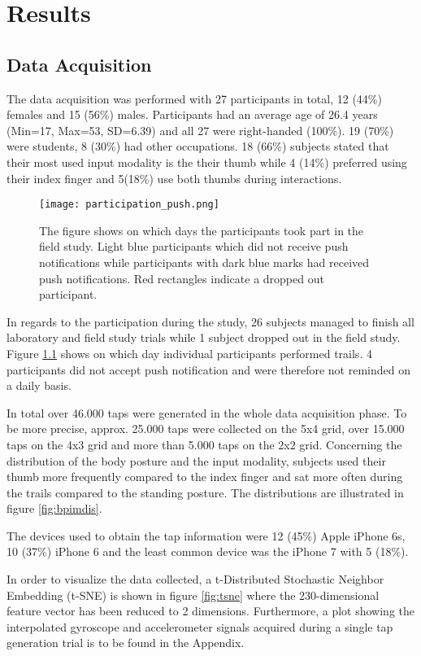 \chapter{Results\label{cha:chapter6}}
\section{Data Acquisition}
The data acquisition was performed with 27 participants in total, 12 (44\%) females and 15 (56\%) males. Participants had an average age of 26.4 years (Min=17, Max=53, SD=6.39) and all 27 were right-handed (100\%). 19 (70\%) were students, 8 (30\%) had other occupations.
18 (66\%) subjects stated that their most used input modality is the their thumb while 4 (14\%) preferred using their index finger and 5(18\%) use both thumbs during interactions.\\

\begin{figure}[h!]
  \centering
  \texttt{[image: participation\_push.png]}
  \caption{The figure shows on which days the participants took part in the field study. Light blue participants which did not receive push notifications while participants with dark blue marks had received push notifications. Red rectangles indicate a dropped out participant.} \label{fig:participation}
\end{figure}

In regards to the participation during the study, 26 subjects managed to finish all laboratory and field study trials while 1 subject dropped out in the field study. Figure \ref{fig:participation} shows on which day individual participants performed trails. 4 participants did not accept push notification and were therefore not reminded on a daily basis.

In total over 46.000 taps were generated in the whole data acquisition phase. To be more precise, approx. 25.000 taps were collected on the 5x4 grid, over 15.000 taps on the 4x3 grid and more than 5.000 taps on the 2x2 grid. Concerning the distribution of the body posture and the input modality, subjects used their thumb more frequently compared to the index finger and sat more often during the trails compared to the standing posture. The distributions are illustrated in figure \ref{fig:bpimdis}.

The devices used to obtain the tap information were 12 (45\%) Apple iPhone 6s, 10 (37\%) iPhone 6 and the least common device was the iPhone 7 with 5 (18\%).

In order to visualize the data collected, a t-Distributed Stochastic Neighbor Embedding (t-SNE) is shown in figure \ref{fig:tsne} where the 230-dimensional feature vector has been reduced to 2 dimensions. Furthermore, a plot showing the interpolated gyroscope and accelerometer signals acquired during a single tap generation trial is to be found in the Appendix.

